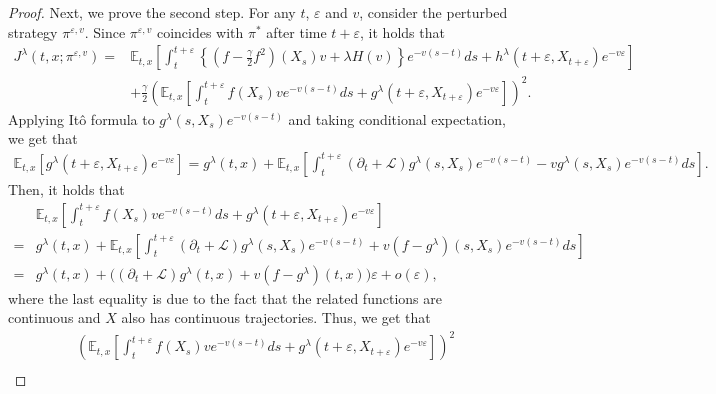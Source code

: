 \documentclass[11pt]{article}
\begin{document}
\begin{proof}
Next, we prove the second step. For any $t$, $\varepsilon$ and $v$, consider the perturbed strategy $\pi^{\varepsilon,v}$. Since $\pi^{\varepsilon,v}$ coincides with $\pi^{*}$ after time $t+\varepsilon$, it holds that 
\begin{equation*}
\begin{split}
J^\lambda(t,x;\pi^{\varepsilon,v})=&\mathbb E_{t,x}\left[\int_t^{t+\varepsilon} \left\{(f-\frac{\gamma}{2}f^2)(X_s)v+\lambda H(v)\right\}e^{-v(s-t)} ds+h^\lambda(t+\varepsilon,X_{t+\varepsilon})e^{-v \varepsilon}\right]\\
&+\frac{\gamma}{2}\left(\mathbb E_{t,x}\left[\int_t^{t+\varepsilon}f(X_s)ve^{-v(s-t)}ds +g^\lambda(t+\varepsilon,X_{t+\varepsilon})e^{-v\varepsilon}\right]\right)^2.
\end{split}
\end{equation*}
Applying It\^o formula to $g^\lambda(s,X_{s})e^{-v(s-t)}$ and taking conditional expectation, we get that 
\begin{equation*}
\begin{split}
\mathbb E_{t,x}[g^\lambda(t+\varepsilon,X_{t+\varepsilon})e^{-v \varepsilon}]=g^\lambda(t,x)+\mathbb E_{t,x}\left[\int_t^{t+\varepsilon} (\partial_t+\mathcal L)g^\lambda(s,X_s)e^{-v(s-t)}-vg^\lambda(s,X_s)e^{-v(s-t)}ds \right].
\end{split}
\end{equation*}
Then, it holds that
\begin{equation*}
\begin{split}
&\mathbb E_{t,x}\left[\int_t^{t+\varepsilon}f(X_s)ve^{-v(s-t)}ds +g^\lambda(t+\varepsilon,X_{t+\varepsilon})e^{-v\varepsilon}\right]\\
=&g^\lambda(t,x)+\mathbb E_{t,x}\left[\int_t^{t+\varepsilon}(\partial_t+\mathcal L) g^\lambda(s,X_s)e^{-v(s-t)}+v(f-g^\lambda)(s,X_s)e^{-v(s-t)} ds\right]\\
=&g^\lambda(t,x)+\bigg((\partial_t+\mathcal L) g^\lambda(t,x)+v(f-g^\lambda)(t,x) \bigg)\varepsilon+o(\varepsilon),
\end{split}
\end{equation*}
where the last equality is  due to the fact that the related functions are continuous and $X$ also has continuous trajectories. Thus, we get that 
\begin{equation*}
\begin{split}
  &\left(\mathbb E_{t,x}\left[\int_t^{t+\varepsilon}f(X_s)ve^{-v(s-t)}ds +g^\lambda(t+\varepsilon,X_{t+\varepsilon})e^{-v\varepsilon}\right]\right)^2\\

\end{split}
\end{equation*}
\end{proof}
\end{document}
